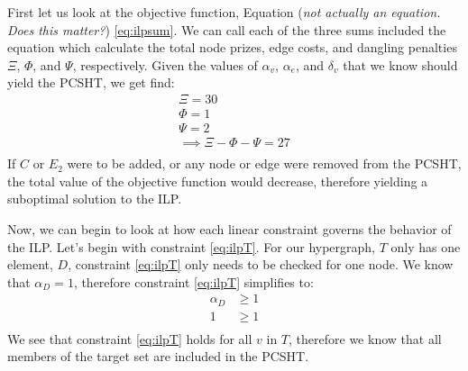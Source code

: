 \documentclass[12pt,twoside]{reedthesis}
\theoremstyle{definition}
\begin{document}
First let us look at the objective function, Equation (\emph{not actually an equation. Does this matter?}) \eqref{eq:ilpsum}. We can call each of the three sums included the equation which calculate the total node prizes, edge costs, and dangling penalties $\Xi$, $\Phi$, and $\Psi$, respectively. Given the values of $\alpha_v$, $\alpha_e$, and $\delta_v$ that we know should yield the PCSHT, we get find:
\begin{gather*}
 \Xi = 30\\
 \Phi = 1\\
 \Psi = 2\\
 \implies \Xi - \Phi - \Psi = 27\\
\end{gather*}%
If $C$ or $E_2$ were to be added, or any node or edge were removed from the PCSHT, the total value of the objective function would decrease, therefore yielding a suboptimal solution to the ILP.\par

Now, we can begin to look at how each linear constraint governs the behavior of the ILP. Let's begin with constraint \eqref{eq:ilpT}. For our hypergraph, $T$ only has one element, $D$, constraint \eqref{eq:ilpT} only needs to be checked for one node. We know that $\alpha_D = 1$, therefore constraint \eqref{eq:ilpT} simplifies to:
\begin{align*}
  \alpha_D &\geq 1\\
  1 &\geq 1\\
\end{align*}
We see that constraint \eqref{eq:ilpT} holds for all $v$ in $T$, therefore we know that all members of the target set are included in the PCSHT.\par
\end{document}
